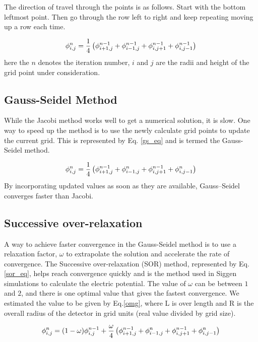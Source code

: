 The direction of travel through the points is as follows. Start with the bottom leftmost point. Then go through the row left to right and keep repeating moving up a row each time.


\begin{equation}{\label{jacobi}}
 \phi_{i,j}^{n} = \frac{1}{4}  \left(\phi^{n-1}_{i+1,j} + \phi^{n-1}_{i-1,j} + \phi^{n-1}_{i,j+1} + \phi^{n-1}_{i,j-1} \right)
\end{equation}
here the $n$ denotes the iteration number, $i$ and $j$ are the radii and height of the grid point under consideration. 

\subsection{Gauss-Seidel Method}

While the Jacobi method works well to get a numerical solution, it is slow. One way to speed up the method is to use the newly calculate grid points to update the current grid. This is represented by Eq. \ref{gs_eq} and is termed the Gauss-Seidel method.


\begin{equation}{\label{gs_eq}}
 \phi_{i,j}^{n} = \frac{1}{4}  \left(\phi^{n-1}_{i+1,j} + \phi^n_{i-1,j} + \phi^{n-1}_{i,j+1} + \phi^n_{i,j-1} \right)
\end{equation}
By incorporating updated values as soon as they are available, Gauss--Seidel converges faster than Jacobi.

\subsection{Successive over-relaxation}

A way to achieve faster convergence in the Gauss-Seidel method is to use a relaxation factor, $\omega$ to extrapolate the solution and accelerate the rate of convergence. The Successive over-relaxation (SOR) method, represented by Eq. \ref{sor_eq}, helps reach convergence quickly and is the method used in Siggen simulations to calculate the electric potential. The value of $\omega$ can be between $1$ and $2$, and there is one optimal value that gives the fastest convergence. We estimated the value to be given by Eq.\ref{omg}, where L is over length and R is the overall radius of the detector in grid units (real value divided by grid size). 

\begin{equation}{\label{sor_eq}}
 \phi_{i,j}^{n} = (1-\omega)\phi^{n-1}_{i,j} + \frac{\omega}{4} \left(\phi^{n-1}_{i+1,j} + \phi^n_{i-1,j} + \phi^{n-1}_{i,j+1} + \phi^n_{i,j-1} \right)
\end{equation}

